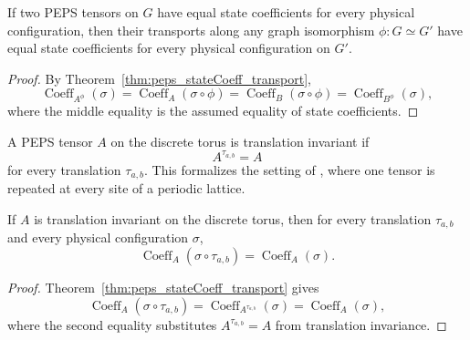 \begin{theorem}%
    \label{thm:peps_sameState_transport}
    \leanok
    If two PEPS tensors on $G$ have equal state coefficients for every
    physical configuration, then their transports along any graph
    isomorphism $\phi:G\simeq G'$ have equal state coefficients for every
    physical configuration on $G'$.
\end{theorem}
\begin{proof}\leanok
    By Theorem~\ref{thm:peps_stateCoeff_transport},
    \[
        \operatorname{Coeff}_{A^\phi}(\sigma)
        =
        \operatorname{Coeff}_{A}(\sigma\circ\phi)
        =
        \operatorname{Coeff}_{B}(\sigma\circ\phi)
        =
        \operatorname{Coeff}_{B^\phi}(\sigma),
    \]
    where the middle equality is the assumed equality of state coefficients.
\end{proof}

\begin{definition}%
    \label{def:peps_torus_translation_invariant}
    \leanok
    A PEPS tensor $A$ on the discrete torus is translation invariant if
    \[
        A^{\tau_{a,b}} = A
    \]
    for every translation $\tau_{a,b}$. This formalizes the setting of
    \cite[Theorem~3]{Molnar2018NormalPEPS}, where one tensor is repeated at
    every site of a periodic lattice.
\end{definition}

\begin{theorem}%
    \label{thm:peps_stateCoeff_translationInvariant}
    \leanok
    If $A$ is translation invariant on the discrete torus, then for every
    translation $\tau_{a,b}$ and every physical configuration $\sigma$,
    \[
        \operatorname{Coeff}_{A}(\sigma\circ\tau_{a,b})
        =
        \operatorname{Coeff}_{A}(\sigma).
    \]
\end{theorem}
\begin{proof}\leanok
    Theorem~\ref{thm:peps_stateCoeff_transport} gives
    \[
        \operatorname{Coeff}_{A}(\sigma\circ\tau_{a,b})
        =
        \operatorname{Coeff}_{A^{\tau_{a,b}}}(\sigma)
        =
        \operatorname{Coeff}_{A}(\sigma),
    \]
    where the second equality substitutes $A^{\tau_{a,b}}=A$ from translation
    invariance.
\end{proof}

